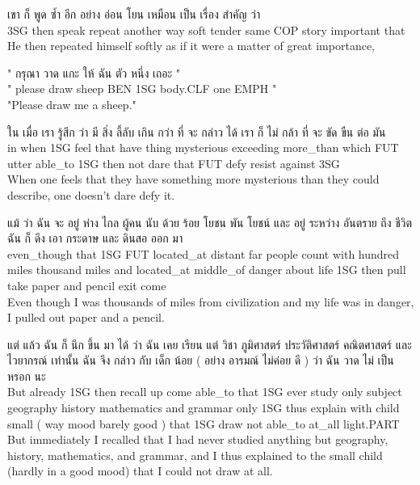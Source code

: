 \documentclass{book}
\begin{document}
	\begin{exe}
		\ex 
		\gll เขา ก็ พูด ซ้ำ อีก อย่าง อ่อน โยน เหมือน เป็น เรื่อง สำคัญ ว่า\\
		\textsc{3SG} then speak repeat another way soft tender same \textsc{COP} story important that\\
		He then repeated himself softly as if it were a matter of great importance, 
	\end{exe}

	\begin{exe}
		\ex 
		\gll " กรุณา วาด แกะ ให้ ฉัน ตัว หนึ่ง เถอะ "\\
		" please draw sheep \textsc{BEN} \textsc{1SG} body.\textsc{CLF} one \textsc{EMPH} "\\
		"Please draw me a sheep."
	\end{exe}

	\begin{exe}
		\ex 
		\gll ใน เมื่อ เรา รู้สึก ว่า มี สิ่ง ลี้ลับ เกิน กว่า ที่ จะ กล่าว ได้ เรา ก็ ไม่ กล้า ที่ จะ ขัด ขืน ต่อ มัน\\
		in when \textsc{1SG} feel that have thing mysterious exceeding more\_than which \textsc{FUT} utter able\_to \textsc{1SG} then not dare that \textsc{FUT} defy resist against \textsc{3SG}\\
		When one feels that they have something more mysterious than they could describe, one doesn't dare defy it.
	\end{exe}

	\begin{exe}
		\ex 
		\gll แม้ ว่า ฉัน จะ อยู่ ห่าง ไกล ผู้คน นับ ด้วย ร้อย โยชน พัน โยชน์ และ อยู่ ระหว่าง อันตราย ถึง ชีวิต ฉัน ก็ ดึง เอา กระดาษ และ ดินสอ ออก มา\\
		even\_though that \textsc{1SG} \textsc{FUT} located\_at distant far people count with hundred miles thousand miles and located\_at middle\_of danger about life \textsc{1SG} then pull take paper and pencil exit come\\
		Even though I was thousands of miles from civilization and my life was in danger, I pulled out paper and a pencil.
	\end{exe}

	\begin{exe}
		\ex 
		\gll แต่ แล้ว ฉัน ก็ นึก ขึ้น มา ได้ ว่า ฉัน เคย เรียน แต่ วิชา ภูมิศาสตร์ ประวัติศาสตร์ คณิตศาสตร์ และ ไวยากรณ์ เท่านั้น ฉัน จึง กล่าว กับ เด็ก น้อย ( อย่าง อารมณ์ ไม่ค่อย ดี ) ว่า ฉัน วาด ไม่ เป็น หรอก นะ\\
		But already \textsc{1SG} then recall up come able\_to that \textsc{1SG} ever study only subject geography history mathematics and grammar only \textsc{1SG} thus explain with child small ( way mood barely good ) that \textsc{1SG} draw not able\_to at\_all light.\textsc{PART}\\
		But immediately I recalled that I had never studied anything but geography, history, mathematics, and grammar, and I thus explained to the small child (hardly in a good mood) that I could not draw at all.
	\end{exe}
\end{document}

